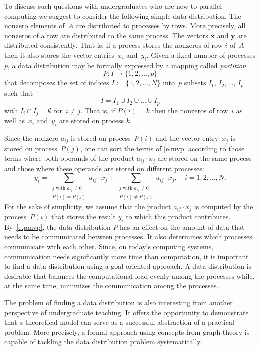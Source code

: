 \documentclass[12pt, twoside,a4paper,toc=bibliography]{scrbook}
\newcommand{\mat}[1]{\ensuremath{#1}}
\newcommand{\vek}[1]{{\ensuremath{\mathbf #1}}}
\begin{document}
To discuss such questions with undergraduates who are new to parallel computing we
suggest to consider the following simple data distribution. The nonzero elements
of~\mat{A} are distributed to processes by rows. More precisely, all nonzeros of a row
are distributed to the same process. The vectors \vek{x} and \vek{y} are distributed
consistently. That is, if a process stores the nonzeros of row $i$ of~\mat{A} then it
also stores the vector entries~$x_i$ and~$y_i$. Given a fixed number of processes $p$, a
data distribution may be formally expressed by a mapping called \emph{partition}
$$
P: I \rightarrow \{1, 2, \dots, p\}
$$
that decomposes the set of indices $I := \{1, 2, \dots, N\}$ into~$p$ subsets $I_1$,
$I_2$, \dots, $I_p$ such that
$$
I = I_1 \cup I_2 \cup \dots \cup I_p
$$
with $I_i \cap I_j = \emptyset$ for~$i \neq j$. That is, if $P(i)=k$ then the nonzeros of
row~$i$ as well as~$x_i$ and~$y_i$ are stored on process $k$.

Since the nonzero $a_{ij}$ is stored on process~$P(i)$ and the vector entry~$x_j$ is
stored on process~$P(j)$, one can sort the terms of \eqref{e.mvp} according to
those terms where both operands of the product $a_{ij} \cdot x_j$ are stored on the same
process and those where these operands are stored on different processes:
\begin{equation}
\label{e.pmvp}
y_i =
\sum_{ \substack{j \text{ with } a_{ij} \neq 0\\ P(i)=P(j)}} a_{ij} \cdot x_j
+ \sum_{ \substack{j \text{ with } a_{ij} \neq 0\\ P(i)\neq P(j)}} a_{ij} \cdot x_j ,
\quad i = 1, 2, \dots, N.
\end{equation}
For the sake of simplicity, we assume that the product $a_{ij} \cdot x_j$ is computed by
the process~$P(i)$ that stores the result $y_i$ to which this product contributes.
By~\eqref{e.pmvp}, the data distribution $P$ has an effect on the amount of data that
needs to be communicated between processes. It also determines which processes
communicate with each other. Since, on today's computing systems, communication needs
significantly more time than computation, it is important to find a data distribution
using a goal-oriented approach. A data distribution is desirable that balances the
computational load evenly among the processes while, at the same time, minimizes the
communication among the processes.

The problem of finding a data distribution is also interesting from another perspective
of undergraduate teaching. It offers the opportunity to demonstrate that a theoretical
model can serve as a successful abstraction of a practical problem. More precisely, a
formal approach using concepts from graph theory is capable of tackling the data
distribution problem systematically.
\end{document}
